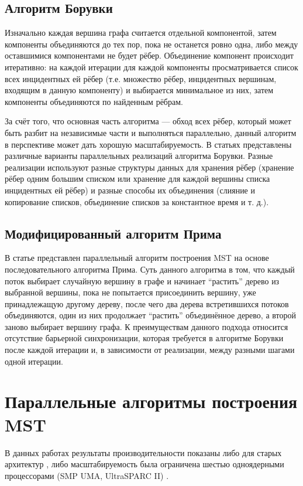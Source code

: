 \documentclass{article}
\begin{document}
\subsection{Алгоритм Борувки}
Изначально каждая вершина графа считается отдельной компонентой, затем компоненты объединяются до тех пор, пока не останется ровно одна, либо между оставшимися компонентами не будет рёбер.
Объединение компонент происходит итеративно: на каждой итерации для каждой компоненты просматривается список всех инцидентных ей рёбер (т.е. множество рёбер, инцидентных вершинам, входящим в данную 
компоненту) и выбирается минимальное из них, затем компоненты объединяются по найденным рёбрам.

За счёт того, что основная часть алгоритма --- обход всех рёбер, который может быть разбит на независимые части и выполняться параллельно, данный алгоритм в перспективе может дать хорошую масштабируемость.
В статьях \cite{dense-mst,boruvka-prima,boruvka-cm5} представлены различные варианты параллельных реализаций алгоритма Борувки.
Разные реализации используют разные структуры данных для хранения рёбер (хранение рёбер одним большим списком или хранение для каждой вершины списка инцидентных ей рёбер) и разные способы их объединения (слияние и копирование списков, объединение списков за константное время и т. д.).

\subsection{Модифицированный алгоритм Прима}
В статье \cite{boruvka-prima} представлен параллельный алгоритм построения MST на основе последовательного алгоритма Прима.
Суть данного алгоритма в том, что каждый поток выбирает случайную вершину в графе и начинает ``растить'' дерево из выбранной вершины, пока не попытается присоединить вершину, уже принадлежащую другому дереву, после чего два дерева встретившихся потоков объединяются, один из них продолжает ``растить'' объединённое дерево, а второй заново выбирает вершину графа. %
К преимуществам данного подхода относится отсутствие барьерной синхронизации, которая требуется в алгоритме Борувки после каждой итерации и, в зависимости от реализации, между разными шагами одной итерации.

\section{Параллельные алгоритмы построения MST}
В данных работах \cite{dense-mst,boruvka-prima,boruvka-cm5} результаты производительности показаны либо для старых архитектур \cite{dense-mst,boruvka-cm5}, либо масштабируемость была ограничена шестью одноядерными процессорами (SMP  UMA, UltraSPARC II) \cite{boruvka-prima} .
\end{document}
